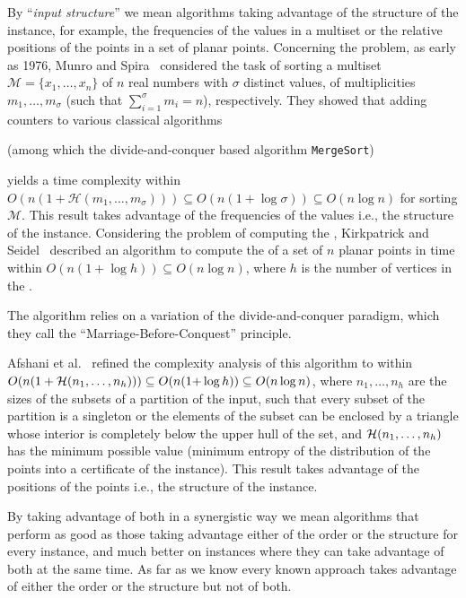 By ``\emph{input structure}'' we mean algorithms taking advantage of
the structure of the instance, for example, the frequencies of the
values in a multiset or the relative positions of the points in a set
of planar points.
Concerning the {} problem, as early as 1976, Munro and
Spira~\cite{1976-JComp-SortingAndSearchingInMultisets-MunroSpira}
considered the task of sorting a multiset
$\mathcal{M}=\{x_1, \dots, x_n\}$ of $n$ real numbers with $\sigma$
distinct values, of multiplicities $m_1, \dots, m_\sigma$ (such that
$\sum_{i=1}^\sigma {m_i}=n$), respectively. They showed that adding
counters to various classical algorithms
\begin{INUTILE}
  (among which the divide-and-conquer based algorithm
  {\tt{MergeSort}})
\end{INUTILE}
yields a time complexity within
$O(n(1+\mathcal{H}(m_1, \dots, m_\sigma))) \subseteq
O(n(1{+}\log{\sigma})) \subseteq O(n\log{n})$ for sorting
$\mathcal{M}$. This result takes advantage of the frequencies of the
values i.e., the structure of the instance.
Considering the problem of computing the {},
Kirkpatrick and
Seidel~\cite{1986-JCom-TheUltimatePlanarConvexHullAlgorithm-KirkpatrickSeidel}
described an algorithm to compute the {} of a set of
$n$ planar points in time within $O(n(1+\log h))\subseteq O(n\log n)$,
where $h$ is the number of vertices in the {}.
\begin{INUTILE}
  The algorithm relies on a variation of the divide-and-conquer
  paradigm, which they call the ``Marriage-Before-Conquest''
  principle.
\end{INUTILE}
Afshani et
al.~\cite{2009-FOCS-InstanceOptimalGeometricAlgorithms-AfshaniBarbayChan}
refined the complexity analysis of this algorithm to within
$O(n(1+{\cal H}(n_1,\ldots,n_h)))\subseteq O(n(1{+}\log h)) \subseteq
O(n\log{n})$, where $n_1, \dots, n_h$ are the sizes of the subsets of
a partition of the input, such that every subset of the partition is a
singleton or the elements of the subset can be enclosed by a triangle
whose interior is completely below the upper hull of the set, and
${\cal H}(n_1,\ldots,n_h)$ has the minimum possible value (minimum
entropy of the distribution of the points into a certificate of the
instance). This result takes advantage of the positions of the points
i.e., the structure of the instance.

By taking advantage of both in a synergistic way we mean algorithms
that perform as good as those taking advantage either of the order or
the structure for every instance, and much better on instances where
they can take advantage of both at the same time. As far as we know
every known approach takes advantage of either the order or the
structure but not of both.


